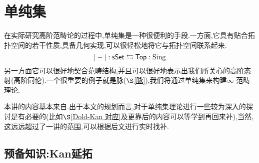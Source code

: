 \chapter{单纯集}
在实际研究高阶范畴论的过程中,单纯集是一种很便利的手段.一方面,它具有贴合拓扑空间的若干性质,具备几何实现,可以很轻松地将它与拓扑空间联系起来.
\[
    |-| : \mathsf{sSet} \leftrightarrows \mathsf{Top} : \operatorname{Sing}
\]
另一方面它可以很好地契合范畴结构,并且可以很好地表示出我们所关心的高阶态射(高阶同伦).一个很重要的例子就是脉($\S$\ref{脉}),我们将通过单纯集来构建$\infty$-范畴理论.\\
\begin{wenxintishi}
    本讲的内容基本来自\parencite[第8章 单纯形方法]{李文威卷二}.出于本文的规划而言,对于单纯集理论进行一些较为深入的探讨是有必要的(比如$\S$\ref{Dold-Kan 对应}及更靠后的内容可以等学到再回来补),当然,这远远超过了一讲的范围,可以根据后文进行实时找补.
\end{wenxintishi}
\section{预备知识:Kan延拓}

